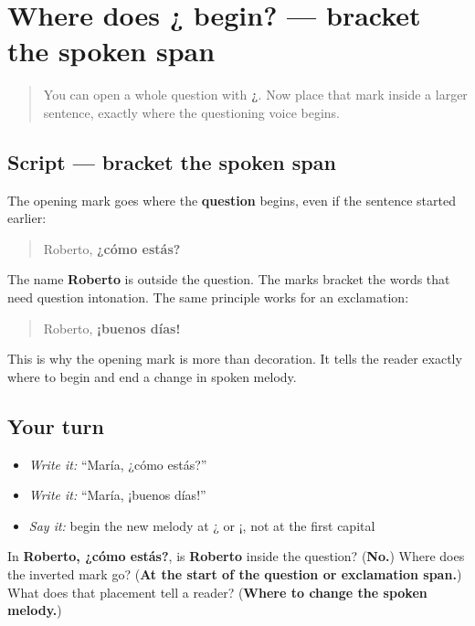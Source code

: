 \section[Roberto, ¿cómo estás?]{Where does ¿ begin? — bracket the spoken span}

\label{lesson:ES-W03-question-span}



\begin{quote}
You can open a whole question with \textbf{¿}. Now place that mark inside a larger sentence, exactly where the questioning voice begins.
\end{quote}

\subsection*{Script — bracket the spoken span}
The opening mark goes where the \textbf{question} begins, even if the sentence started earlier:

\begin{quote}
Roberto, \textbf{¿cómo estás?}
\end{quote}

The name \textbf{Roberto} is outside the question. The marks bracket the words that need question intonation. The same principle works for an exclamation:

\begin{quote}
Roberto, \textbf{¡buenos días!}
\end{quote}

This is why the opening mark is more than decoration. It tells the reader exactly where to begin and end a change in spoken melody.

\subsection*{Your turn}
\begin{itemize}
\raggedright
  \item \emph{Write it:} “María, ¿cómo estás?”
  \item \emph{Write it:} “María, ¡buenos días!”
  \item \emph{Say it:} begin the new melody at ¿ or ¡, not at the first capital
\end{itemize}

\begin{tcolorbox}[breakable,colback=teal!4,colframe=teal!35!black,title={Before you move on}]
In \textbf{Roberto, ¿cómo estás?}, is \textbf{Roberto} inside the question? (\textbf{No.}) Where does the inverted mark go? (\textbf{At the start of the question or exclamation span.}) What does that placement tell a reader? (\textbf{Where to change the spoken melody.})
\end{tcolorbox}
